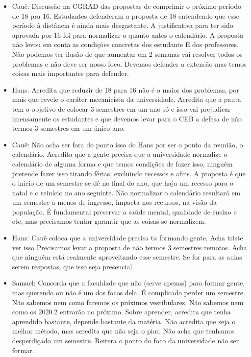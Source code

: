 \documentclass{ata-calico}
\begin{document}
\begin{itemize}
    \item Cauê: Discussão na CGRAD das propostas de comprimir o próximo período de 18 pra 16. Estudantes defenderam a proposta de 18 entendendo que esse período à distância é ainda mais desgastante. A justificativa para ter sido aprovada por 16 foi para normalizar o quanto antes o calendário. A proposta não levou em conta as condições concretas dos estudante E dos professores. Não podemos ter ilusão de que aumentar em 2 semanas vai resolver todos os problemas e não deve ser nosso foco. Devemos defender a extensão mas temos coisas mais importantes para defender.
    
    \item Hans: Acredita que reduzir de 18 para 16 não é o maior dos problemas, por mais que revele o caráter mecanicista da universidade. Acredita que a pauta tem o objetivo de colocar 3 semestres em um ano só e isso vai prejudicar imensamente os estudantes e que devemos levar para o CEB a defesa de não termos 3 semestres em um único ano.
    
    \item Cauê: Não acha ser fora do ponto isso do Hans por ser o ponto da reunião, o calendário. Acredita que a gente precisa que a universidade normalize o calendário de alguma forma e que temos condições de fazer isso, ninguém pretende fazer isso tirando férias, excluindo recessos e afins. A proposta é que o início de um semestre se dê no final do ano, que haja um recesso para o natal e o reinício no ano seguinte. Não normalizar o calendário resultará em um semestre a menos de ingresso, impacta nos recursos, na visão da população. É fundamental preservar a saúde mental, qualidade de ensino e etc, mas precisamos tentar garantir que as coisas se normalizem.
    
    \item Hans: Cauê coloca que a universidade precisa ta formando gente. Acha triste ver isso Precisamos levar a proposta de não termos 3 semestres remotos. Acha que ninguém está realmente aproveitando esse semestre. Se for para as aulas serem respostas, que isso seja presencial.
    
    \item Samuel: Concorda que a faculdade que não (serve apenas) para formar gente, mas querendo ou não é um dos focos dela. É complicado perder um semestre. Não sabemos nem como faremos os próximos vestibulares. Não sabemos nem como os 2020.2 entrarão no próximo. Sobre aprender, acredita que tenha aprendido bastante, depende bastante da matéria. Não acredita que seja o melhor método, mas acredita que não seja o pior. Não acha que tenhamos desperdiçado um semestre. Reitera o ponto do foco da universidade não ser formar.
    

\end{itemize}
\end{document}
